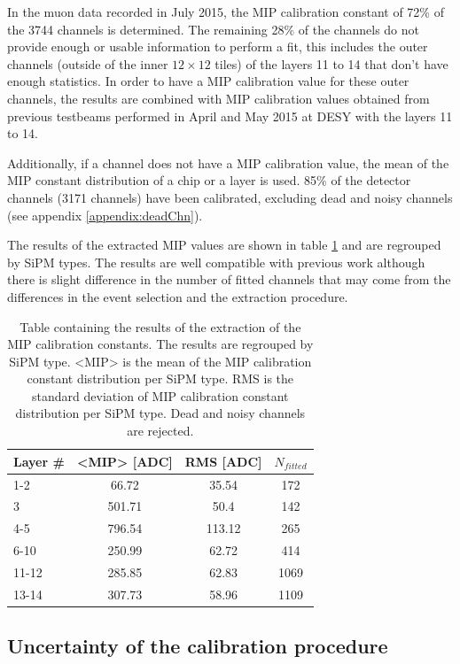 In the muon data recorded in July 2015, the MIP calibration constant of 72\% of the 3744 channels is determined. The remaining 28\% of the channels do not provide enough or usable information to perform a fit, this includes the outer channels (outside of the inner $12 \times 12$ tiles) of the layers 11 to 14 that don't have enough statistics. In order to have a MIP calibration value for these outer channels, the results are combined with MIP calibration values obtained from previous testbeams performed in April and May 2015 at DESY with the layers 11 to 14.

Additionally, if a channel does not have a MIP calibration value, the mean of the MIP constant distribution of a chip or a layer is used. 85\% of the detector channels (3171 channels) have been calibrated, excluding dead and noisy channels (see appendix \ref{appendix:deadChn}).

The results of the extracted MIP values are shown in table \ref{table:MIPAHCAL} and are regrouped by SiPM types. The results are well compatible with previous work \cite{SarahMaster} although there is slight difference in the number of fitted channels that may come from the differences in the event selection and the extraction procedure.

\begin{table}[htb!]
	\centering
	\caption{Table containing the results of the extraction of the MIP calibration constants. The results are regrouped by SiPM type. <MIP> is the mean of the MIP calibration constant distribution per SiPM type. RMS is the standard deviation of MIP calibration constant distribution per SiPM type. Dead and noisy channels are rejected.}
	\label{table:MIPAHCAL}
	\begin{tabular}{@{} lccc @{}}
		\toprule
		Layer \# & <MIP> [ADC] & RMS [ADC] & $N_{fitted}$\\
		\midrule
		1-2 & 66.72 & 35.54 & 172\\
		3 & 501.71 & 50.4 & 142\\
		4-5 & 796.54 & 113.12 & 265\\
		6-10 & 250.99 & 62.72 & 414\\
		11-12 & 285.85 & 62.83 & 1069\\
		13-14 & 307.73 & 58.96 & 1109\\
		\bottomrule
	\end{tabular}
\end{table}

\subsection{Uncertainty of the calibration procedure}

